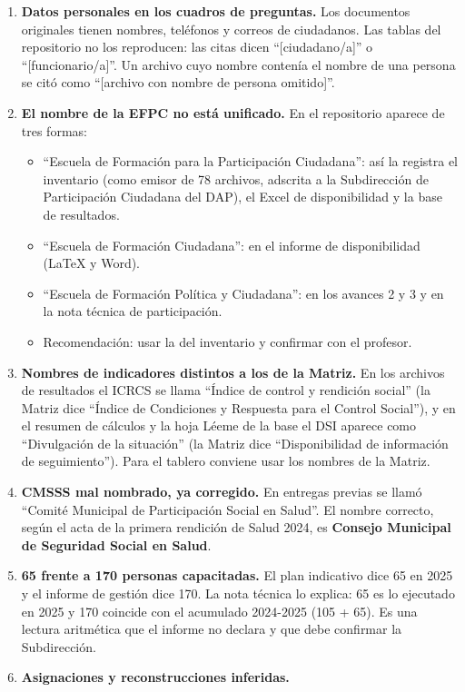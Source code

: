 \documentclass[11pt,letterpaper]{article}
\begin{document}
\begin{enumerate}
\item \textbf{Datos personales en los cuadros de preguntas.} Los documentos originales tienen nombres, teléfonos y correos de ciudadanos. Las tablas del repositorio no los reproducen: las citas dicen ``[ciudadano/a]'' o ``[funcionario/a]''. Un archivo cuyo nombre contenía el nombre de una persona se citó como ``[archivo con nombre de persona omitido]''.
\item \textbf{El nombre de la EFPC no está unificado.} En el repositorio aparece de tres formas:
\begin{itemize}
\item ``Escuela de Formación para la Participación Ciudadana'': así la registra el inventario (como emisor de 78 archivos, adscrita a la Subdirección de Participación Ciudadana del DAP), el Excel de disponibilidad y la base de resultados.
\item ``Escuela de Formación Ciudadana'': en el informe de disponibilidad (LaTeX y Word).
\item ``Escuela de Formación Política y Ciudadana'': en los avances 2 y 3 y en la nota técnica de participación.
\item Recomendación: usar la del inventario y confirmar con el profesor.
\end{itemize}
\item \textbf{Nombres de indicadores distintos a los de la Matriz.} En los archivos de resultados el ICRCS se llama ``Índice de control y rendición social'' (la Matriz dice ``Índice de Condiciones y Respuesta para el Control Social''), y en el resumen de cálculos y la hoja Léeme de la base el DSI aparece como ``Divulgación de la situación'' (la Matriz dice ``Disponibilidad de información de seguimiento''). Para el tablero conviene usar los nombres de la Matriz.
\item \textbf{CMSSS mal nombrado, ya corregido.} En entregas previas se llamó ``Comité Municipal de Participación Social en Salud''. El nombre correcto, según el acta de la primera rendición de Salud 2024, es \textbf{Consejo Municipal de Seguridad Social en Salud}.
\item \textbf{65 frente a 170 personas capacitadas.} El plan indicativo dice 65 en 2025 y el informe de gestión dice 170. La nota técnica lo explica: 65 es lo ejecutado en 2025 y 170 coincide con el acumulado 2024-2025 (105 + 65). Es una lectura aritmética que el informe no declara y que debe confirmar la Subdirección.
\item \textbf{Asignaciones y reconstrucciones inferidas.}

\end{enumerate}
\end{document}
